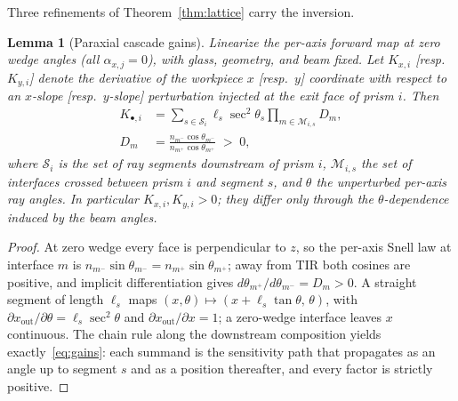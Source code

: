 \documentclass[twocolumn,preprintnumbers,amsmath,amssymb,pra,floatfix]{revtex4-2}
\newtheorem{lemma}{Lemma}
\begin{document}
Three refinements of Theorem~\ref{thm:lattice} carry the inversion.

\begin{lemma}[Paraxial cascade gains]
\label{lem:gains}
Linearize the per-axis forward map at zero wedge angles
(all $\alpha_{x,j}=0$), with glass, geometry, and beam fixed.  Let
$K_{x,i}$ [resp.\ $K_{y,i}$] denote the derivative of the workpiece
$x$ [resp.\ $y$] coordinate with respect to an $x$-slope [resp.\
$y$-slope] perturbation injected at the exit face of prism $i$.  Then
\begin{align}
  K_{\bullet,i}
  &=\sum_{s\in\mathcal{S}_i}\ell_{s}\sec^{2}\!\theta_{s}
  \prod_{m\in\mathcal{M}_{i,s}}D_{m},
  \label{eq:gains}\\
  D_{m}&=\frac{n_{m^{-}}\cos\theta_{m^{-}}}
             {n_{m^{+}}\cos\theta_{m^{+}}}\;>\;0,
  \nonumber
\end{align}
where $\mathcal{S}_i$ is the set of ray segments downstream of prism
$i$, $\mathcal{M}_{i,s}$ the set of interfaces crossed between prism
$i$ and segment $s$, and $\theta$ the unperturbed per-axis ray
angles.  In particular $K_{x,i},K_{y,i}>0$; they differ only through
the $\theta$-dependence induced by the beam angles.
\end{lemma}
\begin{proof}
At zero wedge every face is perpendicular to $z$, so the per-axis
Snell law at interface $m$ is
$n_{m^-}\sin\theta_{m^-}=n_{m^+}\sin\theta_{m^+}$; away from TIR both
cosines are positive, and implicit differentiation gives
$d\theta_{m^+}/d\theta_{m^-}=D_{m}>0$.  A straight segment of length
$\ell_s$ maps $(x,\theta)\mapsto(x+\ell_s\tan\theta,\,\theta)$, with
$\partial x_{\mathrm{out}}/\partial\theta=\ell_s\sec^{2}\theta$ and
$\partial x_{\mathrm{out}}/\partial x=1$; a zero-wedge interface
leaves $x$ continuous.  The chain rule along the downstream
composition yields exactly~\eqref{eq:gains}: each summand is the
sensitivity path that propagates as an angle up to segment $s$ and as
a position thereafter, and every factor is strictly positive.
\end{proof}
\end{document}
